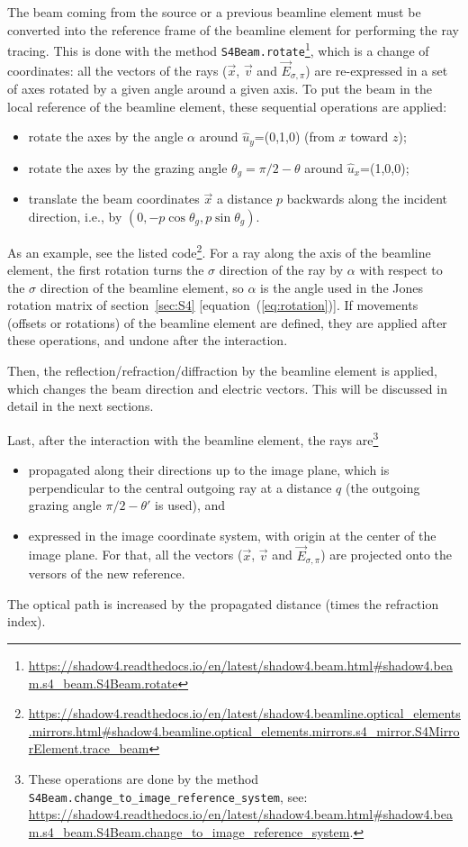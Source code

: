 \documentclass{iucr}
\begin{document}
The beam coming from the source or a previous beamline element must be converted into the reference frame of the beamline element for performing the ray tracing.
This is done with the method {\tt S4Beam.rotate}\footnote{\tiny \url{https://shadow4.readthedocs.io/en/latest/shadow4.beam.html#shadow4.beam.s4_beam.S4Beam.rotate}}, which is a change of coordinates: all the vectors of the rays ($\vec{x}$, $\vec{v}$ and $\vec{E}_{\sigma,\pi}$) are re-expressed in a set of axes rotated by a given angle around a given axis.
To put the beam in the local reference of the beamline element, these sequential operations are applied:
\begin{itemize}
    \item rotate the axes by the angle $\alpha$ around $\hat{u}_y$=(0,1,0) (from $x$ toward $z$);
    \item rotate the axes by the grazing angle $\theta_g=\pi/2-\theta$ around $\hat{u}_x$=(1,0,0);
    \item translate the beam coordinates $\vec{x}$ a distance $p$ backwards along the incident direction, i.e., by $(0, -p\cos\theta_g, p\sin\theta_g)$.
\end{itemize}
As an example, see the listed code\footnote{\tiny \url{https://shadow4.readthedocs.io/en/latest/shadow4.beamline.optical_elements.mirrors.html#shadow4.beamline.optical_elements.mirrors.s4_mirror.S4MirrorElement.trace_beam}}.
For a ray along the axis of the beamline element, the first rotation turns the $\sigma$ direction of the ray by $\alpha$ with respect to the $\sigma$ direction of the beamline element, so $\alpha$ is the angle used in the Jones rotation matrix of section~\ref{sec:S4} [equation~(\ref{eq:rotation})].
If movements (offsets or rotations) of the beamline element are defined, they are applied after these operations, and undone after the interaction.

Then, the reflection/refraction/diffraction by the beamline element is applied, which changes the beam direction and electric vectors.
This will be discussed in detail in the next sections.

Last, after the interaction with the beamline element, the rays are\footnote{
These operations are done by the method {\tt S4Beam.change\_to\_image\_reference\_system}, see: {\tiny \url{https://shadow4.readthedocs.io/en/latest/shadow4.beam.html#shadow4.beam.s4_beam.S4Beam.change_to_image_reference_system}}.
}
\begin{itemize}
    \item propagated along their directions up to the image plane, which is perpendicular to the central outgoing ray at a distance $q$ (the outgoing grazing angle $\pi/2-\theta'$ is used), and
    \item expressed in the image coordinate system, with origin at the center of the image plane. For that, all the vectors ($\vec{x}$, $\vec{v}$ and $\vec{E}_{\sigma,\pi}$) are projected onto the versors of the new reference.
\end{itemize}
The optical path is increased by the propagated distance (times the refraction index).
\end{document}
